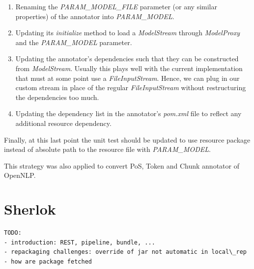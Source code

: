 \documentclass{article}
\newcommand{\id}[1]{\mbox{\textit{#1}}}
\begin{document}
\begin{enumerate}

\item Renaming the \id{PARAM\_MODEL\_FILE} parameter (or any similar properties) of the annotator into \id{PARAM\_MODEL}.

\item Updating its \id{initialize} method to load a \id{ModelStream} through \id{ModelProxy} and the \id{PARAM\_MODEL} parameter. 

\item Updating the annotator's dependencies such that they can be constructed from \id{ModelStream}. Usually this plays well with the current implementation that must at some point use a \id{FileInputStream}. Hence, we can plug in our custom stream in place of the regular \id{FileInputStream} without restructuring the dependencies too much.

\item Updating the dependency list in the annotator's \id{pom.xml} file to reflect any additional resource dependency.

\end{enumerate}

Finally, at this last point the unit test should be updated to use resource package instead of absolute path to the resource file with \id{PARAM\_MODEL}.

This strategy was also applied to convert PoS, Token and Chunk annotator of OpenNLP.


\section{Sherlok}

\begin{verbatim}
TODO:
- introduction: REST, pipeline, bundle, ...
- repackaging challenges: override of jar not automatic in local\_rep
- how are package fetched
\end{verbatim}

\end{document}
